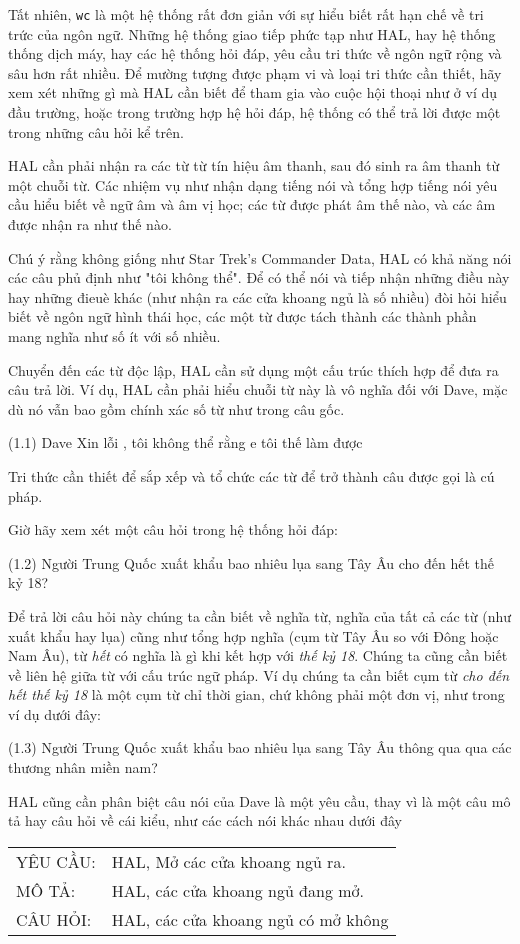 Tất nhiên, \verb|wc| là một hệ thống rất đơn giản với sự hiểu biết rất hạn chế về tri trức của ngôn ngữ. Những hệ thống giao tiếp phức tạp như HAL, hay hệ thống thống dịch máy, hay các hệ thống hỏi đáp, yêu cầu tri thức về ngôn ngữ rộng và sâu hơn rất nhiều. Để mường tượng được phạm vi và loại tri thức cần thiết, hãy xem xét những gì mà HAL cần biết để tham gia vào cuộc hội thoại như ở ví dụ đầu trường, hoặc trong trường hợp hệ hỏi đáp, hệ thống có thể trả lời được một trong những câu hỏi kể trên.

HAL cần phải nhận ra các từ từ tín hiệu âm thanh, sau đó sinh ra âm thanh từ một chuỗi từ. Các nhiệm vụ như nhận dạng tiếng nói và tổng hợp tiếng nói yêu cầu hiểu biết về ngữ âm và âm vị học; các từ được phát âm thế nào, và các âm được nhận ra như thế nào.

Chú ý rằng không giống như Star Trek's Commander Data, HAL có khả năng nói các câu phủ định như "tôi không thể". Để có thể nói và tiếp nhận những điều này hay những đieuè khác (như nhận ra các cửa khoang ngủ là số nhiều) đòi hỏi hiểu biết về ngôn ngữ hình thái học, các một từ được tách thành các thành phần mang nghĩa như số ít với số nhiều.

Chuyển đến các từ độc lập, HAL cần sử dụng một cấu trúc thích hợp để đưa ra câu trả lời. Ví dụ, HAL cần phải hiểu chuỗi từ này là vô nghĩa đối với Dave, mặc dù nó vẫn bao gồm chính xác số từ như trong câu gốc.

(1.1) Dave Xin lỗi , tôi không thể rằng e tôi thế làm được

Tri thức cần thiết để sắp xếp và tổ chức các từ để trở thành câu được gọi là cú pháp.

Giờ hãy xem xét một câu hỏi trong hệ thống hỏi đáp:

(1.2) Người Trung Quốc xuất khẩu bao nhiêu lụa sang Tây Âu cho đến hết thế kỷ 18?

Để trả lời câu hỏi này chúng ta cần biết về nghĩa từ, nghĩa của tất cả các từ (như xuất khẩu hay lụa) cũng như tổng hợp nghĩa (cụm từ Tây Âu so với Đông hoặc Nam Âu), từ \textit{hết} có nghĩa là gì khi kết hợp với \textit{thế kỷ 18}. Chúng ta cũng cần biết về liên hệ giữa từ với cấu trúc ngữ pháp. Ví dụ chúng ta cần biết cụm từ \textit{cho đến hết thế kỷ 18} là một cụm từ chỉ thời gian, chứ không phải một đơn vị, như trong ví dụ dưới đây:

(1.3) Người Trung Quốc xuất khẩu bao nhiêu lụa sang Tây Âu thông qua qua các thương nhân miền nam?

HAL cũng cần phân biệt câu nói của Dave là một yêu cầu, thay vì là một câu mô tả hay câu hỏi về cái kiểu, như các cách nói khác nhau dưới đây

\begin{tabular}{ l l }
	 YÊU CẦU: & HAL, Mở các cửa khoang ngủ ra. \\
	 MÔ TẢ: & HAL, các cửa khoang ngủ đang mở. \\
	 CÂU HỎI: & HAL, các cửa khoang ngủ có mở không
	\end{tabular}
 \label{table:1}








